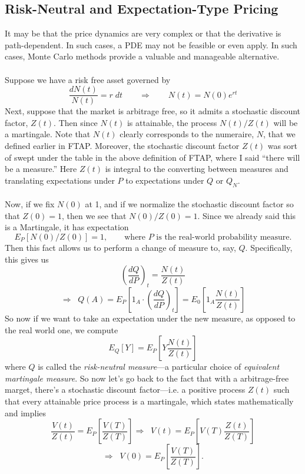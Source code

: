 \documentclass[12pt]{article}
\theoremstyle{plain}
\theoremstyle{definition}
\theoremstyle{remark}
\begin{document}
\subsection{Risk-Neutral and Expectation-Type Pricing}

It may be that the price dynamics are very complex or that the 
derivative is path-dependent.  In such cases, a PDE may not be feasible
or even apply.  In such cases, Monte Carlo methods provide a valuable
and manageable alternative.
\\
\\
Suppose we have a risk free asset governed by
   \[ \frac{dN(t)}{N(t)} = r \; dt\qquad \Rightarrow\qquad
      N(t) = N(0)e^{rt} \]
Next, suppose that the market is arbitrage free, so it admits a 
stochastic discount factor, $Z(t)$.  Then since $N(t)$ is 
attainable, the process $N(t)/Z(t)$ will be a martingale. Note
that $N(t)$ clearly corresponds to the numeraire, $N$, that we 
defined earlier in FTAP. Moreover, the stochastic discount factor
$Z(t)$ was sort of swept under the table in the above definition
of FTAP, where I said ``there will be a measure.'' Here $Z(t)$ 
is integral to the converting between measures and translating
expectations under $P$ to expectations under $Q$ or $Q_N$.
\\
\\
Now, if we fix $N(0)$ at 1, and if we normalize the stochastic
discount factor so that $Z(0)=1$, then we see that $N(0)/Z(0)=1$.
Since we already said this is a Martingale, it has expectation
\[ E_P[N(0)/Z(0)]=1, \qquad \text{where $P$ is the real-world
   probability measure.} \]
Then this fact allows us to perform a change of measure to, say, $Q$.
Specifically, this gives us 
   \[ \left(\frac{dQ}{dP}\right)_t = \frac{N(t)}{Z(t)} \]
   \[\Rightarrow \;\; 
      Q(A) = E_P\left[1_A \cdot \left(\frac{dQ}{dP}\right)_t \right]
      = E_0 \left[1_A\frac{N(t)}{Z(t)} \right] \]
So now if we want to take an expectation under the new measure, as 
opposed to the real world one, we compute
   \[ E_Q[Y] = E_P\left[Y\frac{N(t)}{Z(t)}\right] \]
where $Q$ is called the \emph{risk-neutral measure}---a particular 
choice of \emph{equivalent martingale measure}. So now let's go 
back to the fact that with a arbitrage-free marget, there's
a stochastic discount factor---i.e. a positive process $Z(t)$ such
that every attainable price process is a martingale, which states
mathematically and implies
   \[ \frac{V(t)}{Z(t)} = E_P\left[\frac{V(T)}{Z(T)}\right] 
      \Rightarrow \;\; V(t) = E_P\left[V(T)\frac{Z(t)}{Z(T)}\right] \]
   \[ \Rightarrow \;\; V(0) = E_P\left[\frac{V(T)}{Z(T)}\right].\]
\end{document}
